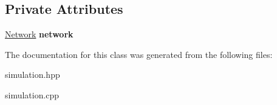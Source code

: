 \subsection*{Private Attributes}
\begin{DoxyCompactItemize}
\item 
\hypertarget{classSimulation_a7b3ddbe6f43ec8b5fee95f1a5cdedbbe}{\hyperlink{classNetwork}{Network} {\bfseries network}}\label{classSimulation_a7b3ddbe6f43ec8b5fee95f1a5cdedbbe}

\end{DoxyCompactItemize}


The documentation for this class was generated from the following files\-:\begin{DoxyCompactItemize}
\item 
simulation.\-hpp\item 
simulation.\-cpp\end{DoxyCompactItemize}
